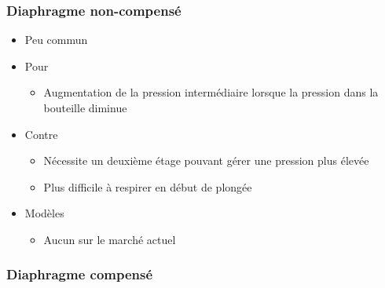 \documentclass[aspectratio=1610,english,12pt]{beamer}
\begin{document}
\subsubsection{Diaphragme non-compensé}
\begin{frame}{\insertsubsubsection}
\end{frame}

\begin{frame}{\insertsubsubsection}
	\begin{itemize}
		\item Peu commun
		\item Pour
		\begin{itemize}
			\item Augmentation de la pression intermédiaire lorsque la pression dans la bouteille diminue
		\end{itemize}
		\item Contre
		\begin{itemize}
			\item Nécessite un deuxième étage pouvant gérer une pression plus élevée
			\item Plus difficile à respirer en début de plongée
		\end{itemize}
	\end{itemize}
\end{frame}

\begin{frame}{\insertsubsubsection}
	\begin{itemize}
		\item Modèles
		\begin{itemize}
			\item Aucun sur le marché actuel
		\end{itemize}
	\end{itemize}
\end{frame}

\subsubsection{Diaphragme compensé}
\begin{frame}{\insertsubsubsection}
\end{frame}

\begin{frame}{\insertsubsubsection}
\end{frame}

\begin{frame}{\insertsubsubsection}
\end{frame}
\end{document}
